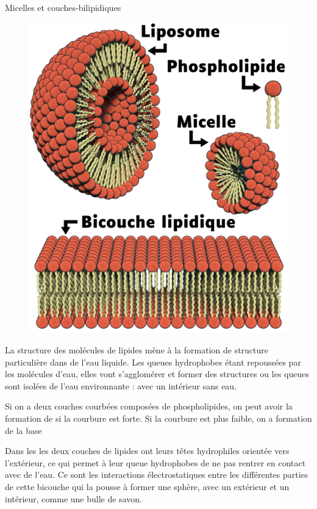\pasCorrection{\newpage \vspace*{-18pt}}
\begin{doc}{Micelles et couches-bilipidiques}
  \begin{figure}
    \centering
    \vspace*{-30pt}
    \includegraphics[width=0.95\linewidth]{images/molecules/biochimie/liposome_micelle_bicouche}
  \end{figure}

  La structure des molécules de lipides mène à la formation de structure particulière dans de l'eau liquide.
  Les queues hydrophobes étant repoussées par les molécules d'eau, elles vont s'agglomérer et former des structures ou les queues sont isolées de l'eau environnante :  avec un intérieur sans eau.
  \smallskip

  Si on a deux couches courbées composées de phospholipides,  on peut avoir la formation de  si la courbure est forte. Si la courbure est plus faible, on a formation de la base 
  \smallskip
  
  Dans les  les deux couches de lipides ont leurs têtes hydrophiles orientée vers l'extérieur, ce qui permet à leur queue hydrophobes de ne pas rentrer en contact avec de l'eau. 
  Ce sont les interactions électrostatiques entre les différentes parties de cette bicouche qui la pousse à former une sphère, avec un extérieur et un intérieur, comme une bulle de savon.
\end{doc}

